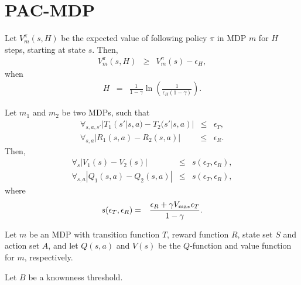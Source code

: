 \section{PAC-MDP}


\newcommand{\A}{$\mathbf{A}$\ }
\newcommand{\As}{$\mathbf{A}$'s\ }


\begin{lemma}

\label{sec:pacmdp:horizon-error}
Let $V^\pi_m(s,H)$ be the expected value of following policy $\pi$ in MDP $m$ for $H$ steps, starting at state $s$. Then,
\begin{eqnarray}
V^\pi_m(s,H) &\geq& V^\pi_m(s) - \epsilon_H,
\end{eqnarray}
when
\begin{eqnarray}
H&=&\frac 1 {1-\gamma} \ln\left(\frac 1 {\epsilon_H (1-\gamma)}\right).
\end{eqnarray}
\end{lemma}

\begin{lemma}

\label{sec:pacmdp:simulation}
Let $m_1$ and $m_2$ be two MDPs, such that
\begin{eqnarray}
\forall_{s,a,s'} |T_1(s'|s,a) - T_2(s'|s,a)| &\leq& \epsilon_T,\\
\forall_{s,a} |R_1(s,a) - R_2(s,a)| &\leq& \epsilon_R.
\end{eqnarray}
Then,
\begin{eqnarray}
\forall_s |V_1(s) - V_2(s)| &\leq& s(\epsilon_T,\epsilon_R),\\
\forall_{s,a} |Q_1(s,a) - Q_2(s,a)| &\leq& s(\epsilon_T,\epsilon_R),
\end{eqnarray}
where
\begin{eqnarray}
s(\epsilon_T,\epsilon_R) &=& \frac {\epsilon_R + \gamma V_{\rm max} \epsilon_T} {1-\gamma}.
\end{eqnarray}
\end{lemma}

\begin{defn}
Let $m$ be an MDP with transition function $T$, reward function $R$, state set $S$ and action set $A$, and let $Q(s,a)$ and $V(s)$ be the $Q$-function and value function for $m$, respectively.
\end{defn}

\begin{defn}
Let $B$ be a knownness threshold.
\end{defn}

